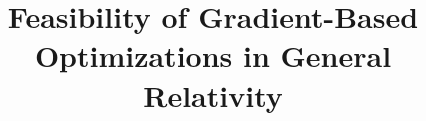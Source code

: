\documentclass[conference]{IEEEtran}
\begin{document}
\title{Feasibility of Gradient-Based Optimizations in General Relativity\\
}

\author{
}

\maketitle
\end{document}
